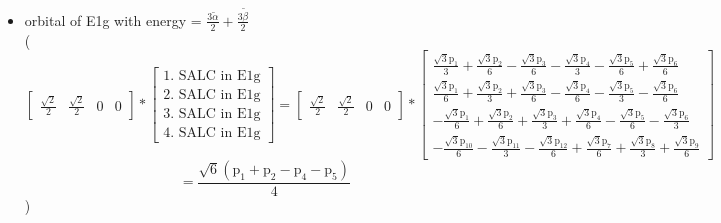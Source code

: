 \documentclass[12pt,a4paper]{article}
\begin{document}
\begin{itemize}
\item orbital of E1g with energy = 
                                $\frac{3 \tilde{\alpha}}{2} + \frac{3 \tilde{\beta}}{2}$ \\
( 
$$
\left[\begin{matrix}\frac{\sqrt{2}}{2} & \frac{\sqrt{2}}{2} & 0 & 0\end{matrix}\right] * \left[\begin{array}{c}\text{1. SALC in E1g} \\ \text{2. SALC in E1g} \\ \text{3. SALC in E1g} \\ \text{4. SALC in E1g}\end{array}\right] = \left[\begin{matrix}\frac{\sqrt{2}}{2} & \frac{\sqrt{2}}{2} & 0 & 0\end{matrix}\right] * \left[\begin{matrix}\frac{\sqrt{3} \text{p}_{1}}{3} + \frac{\sqrt{3} \text{p}_{2}}{6} - \frac{\sqrt{3} \text{p}_{3}}{6} - \frac{\sqrt{3} \text{p}_{4}}{3} - \frac{\sqrt{3} \text{p}_{5}}{6} + \frac{\sqrt{3} \text{p}_{6}}{6}\\\frac{\sqrt{3} \text{p}_{1}}{6} + \frac{\sqrt{3} \text{p}_{2}}{3} + \frac{\sqrt{3} \text{p}_{3}}{6} - \frac{\sqrt{3} \text{p}_{4}}{6} - \frac{\sqrt{3} \text{p}_{5}}{3} - \frac{\sqrt{3} \text{p}_{6}}{6}\\- \frac{\sqrt{3} \text{p}_{1}}{6} + \frac{\sqrt{3} \text{p}_{2}}{6} + \frac{\sqrt{3} \text{p}_{3}}{3} + \frac{\sqrt{3} \text{p}_{4}}{6} - \frac{\sqrt{3} \text{p}_{5}}{6} - \frac{\sqrt{3} \text{p}_{6}}{3}\\- \frac{\sqrt{3} \text{p}_{10}}{6} - \frac{\sqrt{3} \text{p}_{11}}{3} - \frac{\sqrt{3} \text{p}_{12}}{6} + \frac{\sqrt{3} \text{p}_{7}}{6} + \frac{\sqrt{3} \text{p}_{8}}{3} + \frac{\sqrt{3} \text{p}_{9}}{6}\end{matrix}\right] 
 $$ $$ = \frac{\sqrt{6} \left(\text{p}_{1} + \text{p}_{2} - \text{p}_{4} - \text{p}_{5}\right)}{4} 
 $$ 
 )


\end{itemize}
\end{document}

